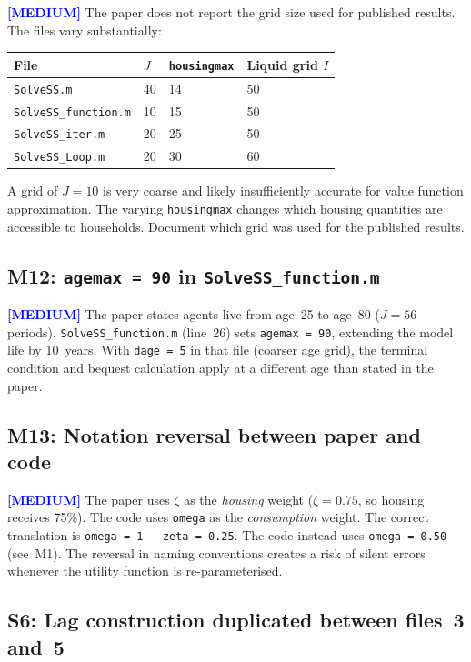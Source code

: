 \documentclass[11pt]{article}
\newcommand{\medium}{\textcolor{blue}{\textbf{[MEDIUM]}}}
\begin{document}
\medium{} The paper does not report the grid size used for published results.
The files vary substantially:

\begin{center}
\begin{tabular}{llll}
\toprule
File & $J$ & \texttt{housingmax} & Liquid grid $I$ \\
\midrule
\texttt{SolveSS.m}           & 40 & 14 & 50 \\
\texttt{SolveSS\_function.m} & 10 & 15 & 50 \\
\texttt{SolveSS\_iter.m}     & 20 & 25 & 50 \\
\texttt{SolveSS\_Loop.m}     & 20 & 30 & 60 \\
\bottomrule
\end{tabular}
\end{center}

A grid of $J = 10$ is very coarse and likely insufficiently accurate for value function
approximation. The varying \texttt{housingmax} changes which housing quantities are
accessible to households. Document which grid was used for the published results.

\subsection*{M12: \texttt{agemax = 90} in \texttt{SolveSS\_function.m}}

\medium{} The paper states agents live from age~25 to age~80 ($J = 56$ periods).
\texttt{SolveSS\_function.m} (line~26) sets \texttt{agemax = 90}, extending the
model life by 10~years. With \texttt{dage = 5} in that file (coarser age grid),
the terminal condition and bequest calculation apply at a different age than stated
in the paper.

\subsection*{M13: Notation reversal between paper and code}

\medium{} The paper uses $\zeta$ as the \emph{housing} weight ($\zeta = 0.75$,
so housing receives 75\%). The code uses \texttt{omega} as the
\emph{consumption} weight. The correct translation is \texttt{omega = 1 - zeta = 0.25}.
The code instead uses \texttt{omega = 0.50} (see~M1). The reversal in naming
conventions creates a risk of silent errors whenever the utility function is
re-parameterised.

\subsection*{S6: Lag construction duplicated between files~3 and~5}
\end{document}
